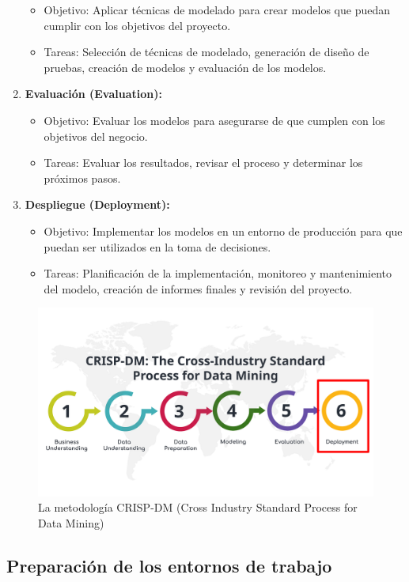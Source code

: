 \documentclass{article}
\begin{document}
\begin{enumerate}
\begin{itemize}
\item Objetivo: Aplicar técnicas de modelado para crear modelos que puedan cumplir con los objetivos del proyecto.
\item Tareas: Selección de técnicas de modelado, generación de diseño de pruebas, creación de modelos y evaluación de los modelos.
\end{itemize}

\item \textbf{Evaluación (Evaluation):}

\begin{itemize}
\item Objetivo: Evaluar los modelos para asegurarse de que cumplen con los objetivos del negocio.
\item Tareas: Evaluar los resultados, revisar el proceso y determinar los próximos pasos.
\end{itemize}

\item \textbf{Despliegue (Deployment):}

\begin{itemize}
\item Objetivo: Implementar los modelos en un entorno de producción para que puedan ser utilizados en la toma de decisiones.
\item Tareas: Planificación de la implementación, monitoreo y mantenimiento del modelo, creación de informes finales y revisión del proyecto.
\end{itemize}
\end{enumerate}

\begin{figure}[h]
\centering
\includegraphics[width=0.75\linewidth]{images/CRISP-DM.png}
\caption{\label{fig:Canasta}La metodología CRISP-DM (Cross Industry Standard Process for Data Mining)}
\end{figure}

\subsection{Preparación de los entornos de trabajo}
\end{document}
